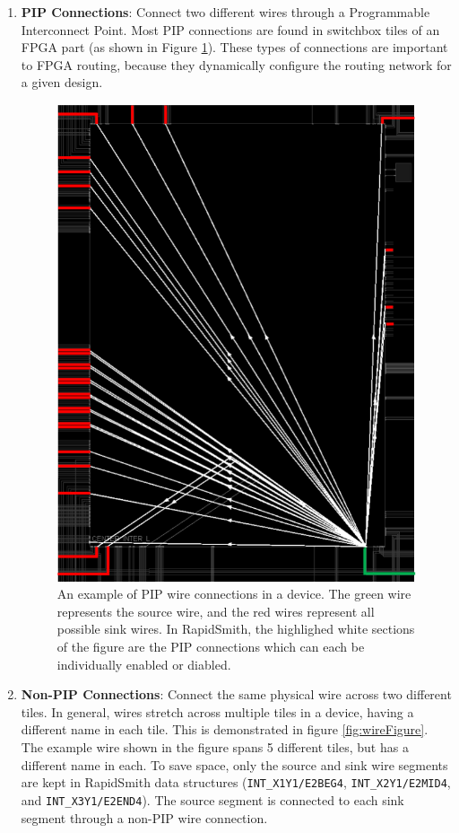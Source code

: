\documentclass[12pt]{article}
\newcommand{\pgm}[1]{{\textbf{#1}}}
\begin{document}
\begin {enumerate}
  \item \pgm{PIP Connections}: Connect two different wires through a
  Programmable Interconnect Point. Most PIP connections are found in
  switchbox tiles of an FPGA part (as shown in Figure \ref{fig:switchboxPIP}).
  These types of connections are important to FPGA routing, because they
  dynamically configure the routing network for a given design.
  
  \begin{figure}[H]
	\centering
	\includegraphics[width=0.8\columnwidth]{pipExample}
	\caption{An example of PIP wire connections in a device. The green wire
	represents the source wire, and the red wires represent all possible sink
	wires. In RapidSmith, the highlighed white sections of the
	figure are the PIP connections which can each be individually
	enabled or diabled.}
	\label{fig:switchboxPIP}
  \end{figure}
  
  \item \pgm{Non-PIP Connections}: Connect the same physical wire across two
  different tiles. In general, wires stretch across multiple tiles in a device, having
  a different name in each tile. This is demonstrated in figure
  \ref{fig:wireFigure}. The example wire shown in the figure spans 5
  different tiles, but has a different name in each. To save space, only the
  source and sink wire segments are kept in RapidSmith data structures
  (\texttt{INT\_X1Y1/E2BEG4}, \texttt{INT\_X2Y1/E2MID4}, and
  \texttt{INT\_X3Y1/E2END4}). The source segment is connected to each sink
  segment through a non-PIP wire connection.
\end{enumerate} 
\end{document}

